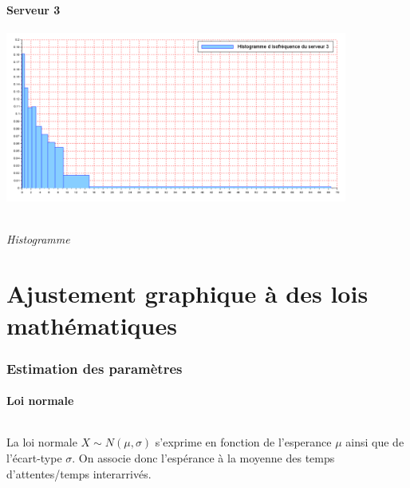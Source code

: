 \documentclass{article}
\begin{document}
\subsection{Serveur 3}
\begin{center}
\includegraphics[width=425px]{img/S3_histo.png}
\end{center}
\paragraph{}

\paragraph{Histogramme}
\begin{center}
\end{center}
\paragraph{}

\part{Ajustement graphique à des lois mathématiques}

\section{Estimation des paramètres}

\subsection{Loi normale}
\paragraph{}
La loi normale $X \sim N(\mu,\sigma)$ s'exprime en fonction de l'esperance $\mu$ ainsi que de l'écart-type $\sigma$. On associe donc l'espérance à la moyenne des temps d'attentes/temps interarrivés.
\end{document}
